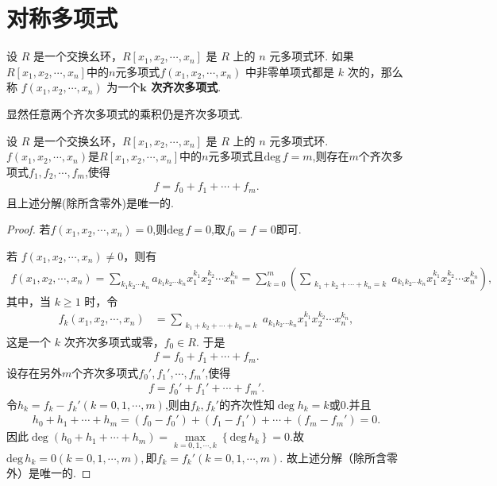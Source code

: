 \documentclass[../../main.tex]{subfiles}%
\begin{document}
\section{对称多项式}

\begin{definition}
设 \( R \) 是一个交换幺环，\( R[x_1, x_2, \cdots, x_n] \) 是 \( R \) 上的 \( n \) 元多项式环. 如果\( R[x_1, x_2, \cdots, x_n] \)中的$n$元多项式\( f(x_1, x_2, \cdots, x_n) \) 中非零单项式都是 \( k \) 次的，那么称 \( f(x_1, x_2, \cdots, x_n) \) 为一个\textbf{\( \boldsymbol{k} \) 次齐次多项式}.
\end{definition}
\begin{remark}
显然任意两个齐次多项式的乘积仍是齐次多项式.
\end{remark}

\begin{theorem}[齐次多项式分解]\label{theorem:多项式的齐次分解}
设 \( R \) 是一个交换幺环，\( R[x_1, x_2, \cdots, x_n] \) 是 \( R \) 上的 \( n \) 元多项式环. \( f(x_1, x_2, \cdots, x_n) \)是\( R[x_1, x_2, \cdots, x_n] \)中的$n$元多项式且$\text{deg}\,f=m$,则存在$m$个齐次多项式$f_1,f_2,\cdots,f_m$,使得
\begin{align*}
f=f_0+f_1+\cdots+f_m.
\end{align*}
且上述分解(除所含零外)是唯一的.
\end{theorem}
\begin{proof}

若$f(x_1,x_2,\cdots,x_n)=0$,则$\text{deg}\,f=0$,取$f_0=f=0$即可.

若 \( f(x_1, x_2, \cdots, x_n) \neq 0 \)，则有
\begin{align*}
f(x_1, x_2, \cdots, x_n) = \sum_{k_1k_2\cdots k_n} a_{k_1k_2\cdots k_n} x_1^{k_1} x_2^{k_2} \cdots x_n^{k_n} = \sum_{k=0}^m \left( \sum_{\substack{k_1 + k_2 + \cdots + k_n = k}} a_{k_1k_2\cdots k_n} x_1^{k_1} x_2^{k_2} \cdots x_n^{k_n} \right),
\end{align*}
其中，当 \( k \geqslant 1 \) 时，令
\begin{align*}
f_k(x_1, x_2, \cdots, x_n) &= \sum_{\substack{k_1 + k_2 + \cdots + k_n = k}} a_{k_1k_2\cdots k_n} x_1^{k_1} x_2^{k_2} \cdots x_n^{k_n},
\end{align*}
这是一个 \( k \) 次齐次多项式或零，\( f_0 \in R \). 于是
\begin{align*}
f = f_0 + f_1 + \cdots + f_m.
\end{align*}
设存在另外$m$个齐次多项式$f_0',f_1',\cdots,f_m'$,使得
\begin{align*}
f=f_0'+f_1'+\cdots+f_m'.
\end{align*}
令$h_k=f_k-f_k'(k=0,1,\cdots,m)$,则由$f_k,f_k'$的齐次性知$\deg h_k=k\text{或}0.$并且
\begin{align*}
h_0+h_1+\cdots+h_m=(f_0-f_0')+(f_1-f_1')+\cdots+(f_m-f_m')=0.
\end{align*}
因此$\deg (h_0+h_1+\cdots+h_m)=\underset{k=0,1,\cdots ,k}{\max}\left\{ \mathrm{deg}\,h_k \right\}=0.$故$\mathrm{deg}\,h_k=0\left( k=0,1,\cdots ,m \right),$即$f_k=f_k'\left( k=0,1,\cdots ,m \right).$
故上述分解（除所含零外）是唯一的.

\end{proof}
\end{document}
